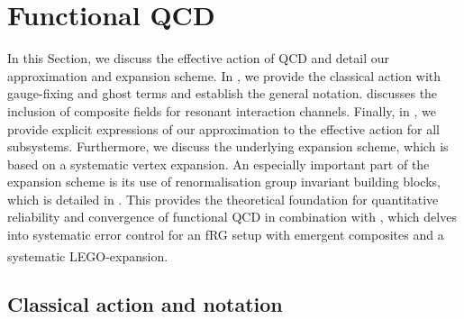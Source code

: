 \documentclass[aps,twocolumn,prd,superscriptaddress]{revtex4-2}
\newcommand{\LEGO}{LEGO\textsuperscript{\textregistered}}
\begin{document}
\section{Functional QCD}
\label{sec:QCDtrunc}

In this Section, we discuss the effective action of QCD and detail our approximation and expansion scheme. In , we provide the classical action with gauge-fixing and ghost terms and establish the general notation.  discusses the inclusion of composite fields for resonant interaction channels. Finally, in , we provide explicit expressions of our approximation to the effective action for all subsystems. 
Furthermore, we discuss the underlying expansion scheme, which is based on a systematic vertex expansion. An especially important part of the expansion scheme is its use of renormalisation group invariant building blocks, which is detailed in . This provides the theoretical foundation for quantitative reliability and convergence of functional QCD in combination with , which delves into systematic error control for an fRG setup with emergent composites and a systematic \LEGO-expansion. 


\subsection{Classical action and notation}
\label{sec:SQCD+notation}
\end{document}
